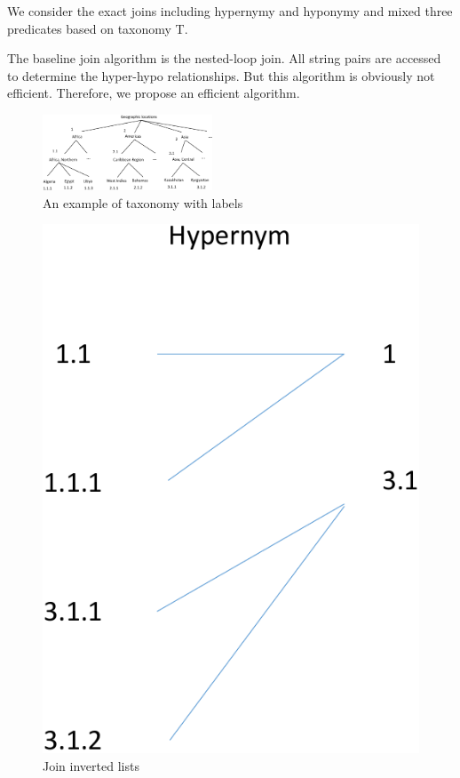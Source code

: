 \documentclass{sig-alternate}
\begin{document}
We consider the exact joins including hypernymy and hyponymy and mixed three predicates based on taxonomy T.



The baseline join algorithm is the nested-loop join. All string pairs are accessed to determine the hyper-hypo relationships. But this algorithm is obviously not efficient. Therefore, we propose an efficient algorithm.



\begin{figure}[t]
\centering
\includegraphics[width=0.45\textwidth]{figures/taxonomylabels}
 \caption{An example of taxonomy with labels}
\label{fig:taxonomy}
\end{figure}



\begin{figure}[t]
\centering
\includegraphics[scale=0.4]{figures/labeljoins}
 \caption{Join inverted lists}
\label{fig:taxonomy}
\end{figure}
\end{document}
